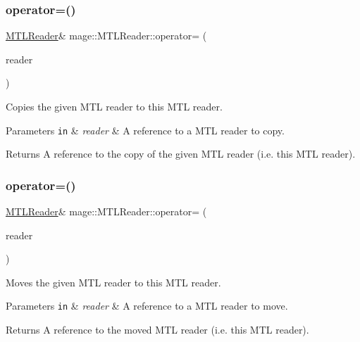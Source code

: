 \subsubsection{\texorpdfstring{operator=()}{operator=()}\hspace{0.1cm}{\footnotesize\ttfamily [1/2]}}
{\footnotesize\ttfamily \hyperlink{classmage_1_1_m_t_l_reader}{M\+T\+L\+Reader}\& mage\+::\+M\+T\+L\+Reader\+::operator= (\begin{DoxyParamCaption}\item[{const \hyperlink{classmage_1_1_m_t_l_reader}{M\+T\+L\+Reader} \&}]{reader }\end{DoxyParamCaption})\hspace{0.3cm}{\ttfamily [delete]}}

Copies the given M\+TL reader to this M\+TL reader.


\begin{DoxyParams}[1]{Parameters}
\mbox{\tt in}  & {\em reader} & A reference to a M\+TL reader to copy. \\
\hline
\end{DoxyParams}
\begin{DoxyReturn}{Returns}
A reference to the copy of the given M\+TL reader (i.\+e. this M\+TL reader). 
\end{DoxyReturn}
\hypertarget{classmage_1_1_m_t_l_reader_aa777389ff4a3cd2f1df2cbf5c6da708e}{}\label{classmage_1_1_m_t_l_reader_aa777389ff4a3cd2f1df2cbf5c6da708e} 
\subsubsection{\texorpdfstring{operator=()}{operator=()}\hspace{0.1cm}{\footnotesize\ttfamily [2/2]}}
{\footnotesize\ttfamily \hyperlink{classmage_1_1_m_t_l_reader}{M\+T\+L\+Reader}\& mage\+::\+M\+T\+L\+Reader\+::operator= (\begin{DoxyParamCaption}\item[{\hyperlink{classmage_1_1_m_t_l_reader}{M\+T\+L\+Reader} \&\&}]{reader }\end{DoxyParamCaption})\hspace{0.3cm}{\ttfamily [delete]}}

Moves the given M\+TL reader to this M\+TL reader.


\begin{DoxyParams}[1]{Parameters}
\mbox{\tt in}  & {\em reader} & A reference to a M\+TL reader to move. \\
\hline
\end{DoxyParams}
\begin{DoxyReturn}{Returns}
A reference to the moved M\+TL reader (i.\+e. this M\+TL reader). 
\end{DoxyReturn}
\hypertarget{classmage_1_1_m_t_l_reader_ac3981549364be195f96b32cfafc8b147}{}\label{classmage_1_1_m_t_l_reader_ac3981549364be195f96b32cfafc8b147} 
